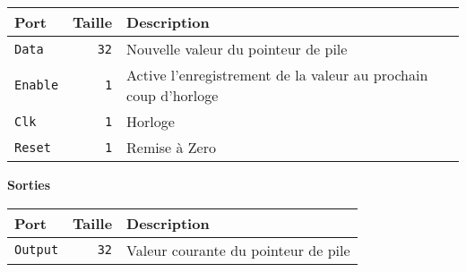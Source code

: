 \begin{tabular}{|l|r|l|}
\hline
\textbf{Port}		& \textbf{Taille} & \textbf{Description}\\
\hline

\texttt{Data}		& \texttt{32} & Nouvelle valeur du pointeur de pile\\
\hline
\texttt{Enable}		&  \texttt{1} & Active l'enregistrement de la valeur au prochain coup d'horloge\\
\hline
\texttt{Clk}		&  \texttt{1} & Horloge\\
\hline
\texttt{Reset}		&  \texttt{1} & Remise à Zero\\
\hline


\hline
\end{tabular}

\vspace{1em}
\textbf{Sorties}\\

\begin{tabular}{|l|r|l|}
\hline 
\textbf{Port} & \textbf{Taille} & \textbf{Description}\\
\hline

\hline
\texttt{Output}		& \texttt{32} & Valeur courante du pointeur de pile\\

\hline
\end{tabular}

